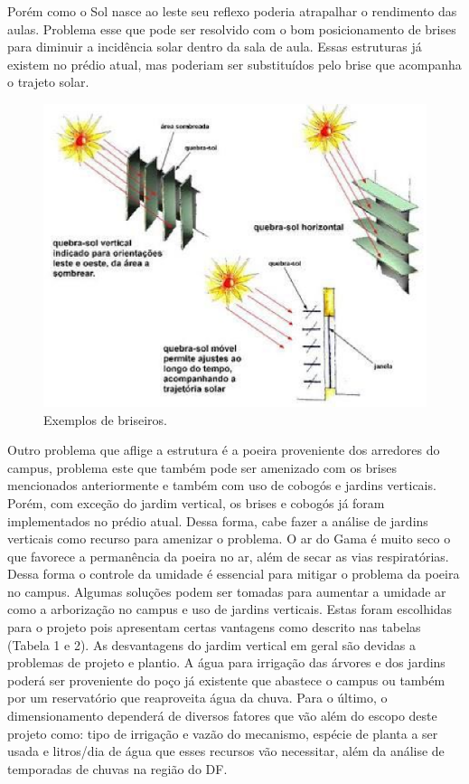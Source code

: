 Porém como o Sol nasce ao leste seu reflexo poderia atrapalhar o rendimento das aulas. Problema esse que pode ser resolvido com o bom posicionamento de brises para diminuir a incidência solar dentro da sala de aula. Essas estruturas já existem no prédio atual, mas poderiam ser substituídos pelo brise que acompanha o trajeto solar.

\begin{figure}[!h]
  \centering
  \includegraphics[keepaspectratio=true,scale=0.5]{figuras/briseiros.eps}
  \caption{Exemplos de briseiros.}
  \label{fig:briseiros}
\end{figure}

Outro problema que aflige a estrutura é a poeira proveniente dos arredores do campus, problema este que também pode ser amenizado com os brises mencionados anteriormente e também com uso de cobogós e jardins verticais. Porém, com exceção do jardim vertical, os brises e cobogós já foram implementados no prédio atual. Dessa forma, cabe fazer a análise de jardins verticais como recurso para amenizar o problema.
O ar do Gama é muito seco o que favorece a permanência da poeira no ar, além de secar as vias respiratórias. Dessa forma o controle da umidade é essencial para mitigar o problema da poeira no campus. Algumas soluções podem ser tomadas para aumentar a umidade ar como a arborização no campus e uso de jardins verticais. Estas foram escolhidas para o projeto pois apresentam certas vantagens como descrito nas tabelas (Tabela 1 e 2). As desvantagens do jardim vertical em geral são devidas a problemas de projeto e plantio. A água para irrigação das árvores e dos jardins poderá ser proveniente do poço já existente que abastece o campus ou também por um reservatório que reaproveita água da chuva. Para o último, o dimensionamento dependerá de diversos fatores que vão além do escopo deste projeto como: tipo de irrigação e vazão do mecanismo, espécie de planta a ser usada e litros/dia de água que esses recursos vão necessitar, além da análise de temporadas de chuvas na região do DF.

